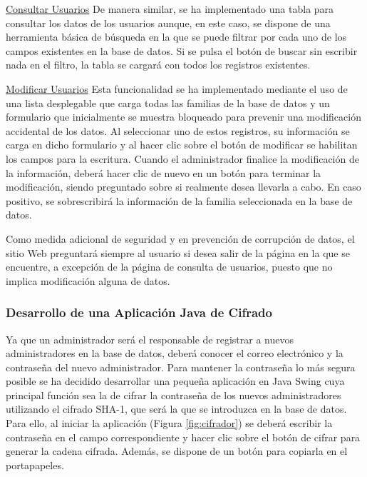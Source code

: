 \clearpage

\noindent \underline{Consultar Usuarios} \newline
De manera similar, se ha implementado una tabla para consultar los datos de los usuarios aunque, en este caso, se dispone de una herramienta básica de búsqueda en la que se puede filtrar por cada uno de los campos existentes en la base de datos. Si se pulsa el botón de buscar sin escribir nada en el filtro, la tabla se cargará con todos los registros existentes.

\noindent \underline{Modificar Usuarios} \newline
Esta funcionalidad se ha implementado mediante el uso de una lista desplegable que carga todas las familias de la base de datos y un formulario que inicialmente se muestra bloqueado para prevenir una modificación accidental de los datos. Al seleccionar uno de estos registros, su información se carga en dicho formulario y al hacer clic sobre el botón de modificar se habilitan los campos para la escritura. Cuando el administrador finalice la modificación de la información, deberá hacer clic de nuevo en un botón para terminar la modificación, siendo preguntado sobre si realmente desea llevarla a cabo. En caso positivo, se sobrescribirá la información de la familia seleccionada en la base de datos.

Como medida adicional de seguridad y en prevención de corrupción de datos, el sitio Web preguntará siempre al usuario si desea salir de la página en la que se encuentre, a excepción de la página de consulta de usuarios, puesto que no implica modificación alguna de datos.

\subsubsection{Desarrollo de una Aplicación Java de Cifrado}
Ya que un administrador será el responsable de registrar a nuevos administradores en la base de datos, deberá conocer el correo electrónico y la contraseña del nuevo administrador. Para mantener la contraseña lo más segura posible se ha decidido desarrollar una pequeña aplicación en Java Swing cuya principal función sea la de cifrar la contraseña de los nuevos administradores utilizando el cifrado SHA-1, que será la que se introduzca en la base de datos. Para ello, al iniciar la aplicación (Figura \ref{fig:cifrador}) se deberá escribir la contraseña en el campo correspondiente y hacer clic sobre el botón de cifrar para generar la cadena cifrada. Además, se dispone de un botón para copiarla en el portapapeles.

